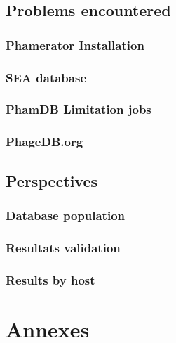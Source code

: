 \documentclass[a4paper,11pt]{report}
\begin{document}
\section{Problems encountered}
\subsection{Phamerator Installation}
\subsection{SEA database}
\subsection{PhamDB Limitation jobs}
\subsection{PhageDB.org}

\section{Perspectives}
\subsection{Database population}
\subsection{Resultats validation}
\subsection{Results by host}

\addtocounter{chapter}{1}


\chapter{Annexes}
\end{document}
